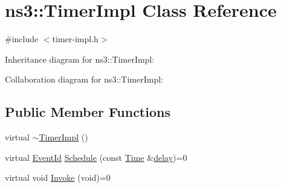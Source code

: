 \hypertarget{classns3_1_1TimerImpl}{}\section{ns3\+:\+:Timer\+Impl Class Reference}
\label{classns3_1_1TimerImpl}


{\ttfamily \#include $<$timer-\/impl.\+h$>$}



Inheritance diagram for ns3\+:\+:Timer\+Impl\+:


Collaboration diagram for ns3\+:\+:Timer\+Impl\+:
\subsection*{Public Member Functions}
\begin{DoxyCompactItemize}
\item 
virtual \hyperlink{classns3_1_1TimerImpl_a65b41c070e7f112cd76e0cc54ae58cda}{$\sim$\+Timer\+Impl} ()
\item 
virtual \hyperlink{classns3_1_1EventId}{Event\+Id} \hyperlink{classns3_1_1TimerImpl_ada4bd0cb95a21f3018b34e1582d2cd78}{Schedule} (const \hyperlink{classns3_1_1Time}{Time} \&\hyperlink{mmwave_2model_2fading-traces_2fading__trace__generator_8m_a7964e6aa8f61a9d28973c8267a606ad8}{delay})=0
\item 
virtual void \hyperlink{classns3_1_1TimerImpl_a1a59aeeb618723921a91a918ed2ba557}{Invoke} (void)=0
\end{DoxyCompactItemize}
{\bf }\par
